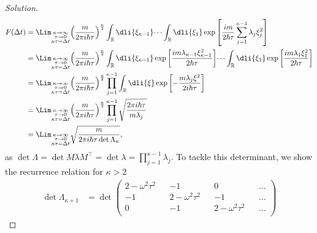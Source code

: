 \begin{proof}[Solution]
   \begin{align*}
      F(\Delta t) &= \Lim_{\substack{\kappa \to \infty\\ \tau \to 0\\ \kappa \tau = \Delta t}}{\left(\frac{m}{2\pi i \hbar \tau}\right)^{\frac\kappa2}\int_{\mathbb{R}} \dli{\xi_{\kappa - 1}} \dots \int_{\mathbb{R}} \dli{\xi_1} \exp\left[\frac{im}{2 \hbar \tau} \sum_{j = 1}^{\kappa - 1} \lambda_j \xi_j^2\right]}\\
                  &= \Lim_{\substack{\kappa \to \infty\\ \tau \to 0\\ \kappa \tau = \Delta t}}{\left(\frac{m}{2\pi i \hbar \tau}\right)^{\frac\kappa2}\int_{\mathbb{R}} \dli{\xi_{\kappa - 1}} \exp\left[\frac{im \lambda_{\kappa - 1} \xi_{\kappa - 1}^2}{2 \hbar \tau}\right]\dots \int_{\mathbb{R}} \dli{\xi_1} \exp\left[\frac{im \lambda_1 \xi_{1}^2}{2 \hbar \tau}\right]}\\
                  &= \Lim_{\substack{\kappa \to \infty\\ \tau \to 0\\ \kappa \tau = \Delta t}}{\left(\frac{m}{2\pi i \hbar \tau}\right)^{\frac\kappa2} \prod_{j = 1}^{\kappa - 1} \int_{\mathbb{R}} \dli{\xi} \exp\left[-\frac{m \lambda_j \xi^2}{2i \hbar \tau}\right]}\\
                  &= \Lim_{\substack{\kappa \to \infty\\ \tau \to 0\\ \kappa \tau = \Delta t}}{\left(\frac{m}{2\pi i \hbar \tau}\right)^{\frac\kappa2} \prod_{j = 1}^{\kappa - 1} \sqrt{\frac{2\pi i\hbar \tau}{m \lambda_j}}}\\
                  &= \Lim_{\substack{\kappa \to \infty\\ \tau \to 0\\ \kappa \tau = \Delta t}}{\sqrt{\frac{m}{2\pi i \hbar \tau \det \Lambda_\kappa}}},
   \end{align*}
   as \(\det{\Lambda} = \det{M \lambda M^\top} = \det{\lambda} = \prod_{j = 1}^{\kappa - 1}{\lambda_{j}}.\) To tackle this determinant, we show the recurrence relation for \(\kappa > 2\)
   \begin{align*}
      \det \Lambda_{\kappa + 1} 
      &= \det 
      \begin{pmatrix}
         2- \omega^2 \tau^2 && -1 && 0 && \dots\\
         -1 && 2 - \omega^2 \tau^2 && -1 && \dots\\
         0 && -1 && 2 - \omega^2 \tau^2 && \dots\\

\end{pmatrix}
\end{align*}
\end{proof}

